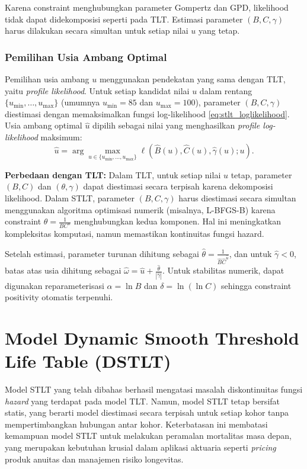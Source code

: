 Karena constraint menghubungkan parameter Gompertz dan GPD, likelihood tidak dapat didekomposisi seperti pada TLT. Estimasi parameter $(B, C, \gamma)$ harus dilakukan secara simultan untuk setiap nilai $u$ yang tetap.

\subsubsection{Pemilihan Usia Ambang Optimal}

Pemilihan usia ambang $u$ menggunakan pendekatan yang sama dengan TLT, yaitu \textit{profile likelihood}. Untuk setiap kandidat nilai $u$ dalam rentang $\{u_{\min}, \ldots, u_{\max}\}$ (umumnya $u_{\min} = 85$ dan $u_{\max} = 100$), parameter $(B, C, \gamma)$ diestimasi dengan memaksimalkan fungsi log-likelihood \eqref{eq:stlt_loglikelihood}. Usia ambang optimal $\hat{u}$ dipilih sebagai nilai yang menghasilkan \textit{profile log-likelihood} maksimum:
\begin{equation}
\hat{u} = \arg\max_{u \in \{u_{\min}, \ldots, u_{\max}\}} \ell(\hat{B}(u), \hat{C}(u), \hat{\gamma}(u); u).
\label{eq:stlt_profile_likelihood_optimal}
\end{equation}

\textbf{Perbedaan dengan TLT:} Dalam TLT, untuk setiap nilai $u$ tetap, parameter $(B, C)$ dan $(\theta, \gamma)$ dapat diestimasi secara terpisah karena dekomposisi likelihood. Dalam STLT, parameter $(B, C, \gamma)$ harus diestimasi secara simultan menggunakan algoritma optimisasi numerik (misalnya, L-BFGS-B) karena constraint $\theta = \frac{1}{BC^u}$ menghubungkan kedua komponen. Hal ini meningkatkan kompleksitas komputasi, namun memastikan kontinuitas fungsi hazard.

Setelah estimasi, parameter turunan dihitung sebagai $\hat{\theta} = \frac{1}{\hat{B}\hat{C}^{\hat{u}}}$, dan untuk $\hat{\gamma} < 0$, batas atas usia dihitung sebagai $\hat{\omega} = \hat{u} + \frac{\hat{\theta}}{|\hat{\gamma}|}$. Untuk stabilitas numerik, dapat digunakan reparameterisasi $\alpha = \ln B$ dan $\delta = \ln(\ln C)$ sehingga constraint positivity otomatis terpenuhi.
\section{Model Dynamic Smooth Threshold Life Table (DSTLT)}

Model STLT yang telah dibahas berhasil mengatasi masalah diskontinuitas fungsi \textit{hazard} yang terdapat pada model TLT. Namun, model STLT tetap bersifat statis, yang berarti model diestimasi secara terpisah untuk setiap kohor tanpa mempertimbangkan hubungan antar kohor. Keterbatasan ini membatasi kemampuan model STLT untuk melakukan peramalan mortalitas masa depan, yang merupakan kebutuhan krusial dalam aplikasi aktuaria seperti \textit{pricing} produk anuitas dan manajemen risiko longevitas.

